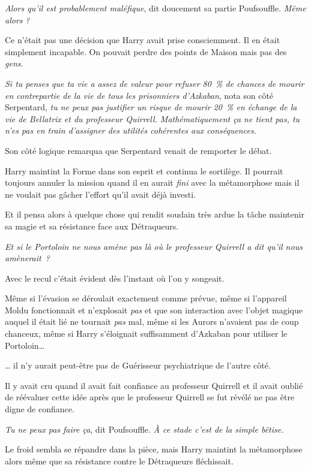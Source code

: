 \emph{Alors qu'il est probablement maléfique}, dit doucement sa partie Poufsouffle. \emph{Même alors} \emph{?}

Ce n'était pas une décision que Harry avait prise consciemment. Il en était simplement incapable. On pouvait perdre des points de Maison mais pas des \emph{gens}.

\emph{Si tu penses que ta vie a assez de valeur pour refuser 80~\% de chances de mourir en contrepartie de la vie de tous les prisonniers d'Azkaban}, nota son côté Serpentard, \emph{tu ne peux pas justifier un risque de mourir 20~\% en échange de la vie de Bellatrix et du professeur Quirrell. Mathématiquement ça ne tient pas, tu n'es pas en train d'assigner des utilités cohérentes aux conséquences.}

Son côté logique remarqua que Serpentard venait de remporter le débat.

Harry maintint la Forme dans son esprit et continua le sortilège. Il pourrait toujours annuler la mission quand il en aurait \emph{fini} avec la métamorphose mais il ne voulait pas gâcher l'effort qu'il avait déjà investi.

Et il pensa alors à quelque chose qui rendit soudain très ardue la tâche maintenir sa magie et sa résistance face aux Détraqueurs.

\emph{Et si le Portoloin ne nous amène pas là où le professeur Quirrell a dit qu'il nous amènerait~?}

Avec le recul c'était évident dès l'instant où l'on y songeait.

Même si l'évasion se déroulait exactement comme prévue, même si l'appareil Moldu fonctionnait et n'explosait \emph{pas} et que son interaction avec l'objet magique auquel il était lié ne tournait \emph{pas} mal, même si les Aurors n'avaient pas de coup chanceux, même si Harry s'éloignait suffisamment d'Azkaban pour utiliser le Portoloin…

… il n'y aurait peut-être pas de Guérisseur psychiatrique de l'autre côté.

Il y avait cru quand il avait fait confiance au professeur Quirrell et il avait oublié de réévaluer cette idée après que le professeur Quirrell se fut révélé ne pas être digne de confiance.

\emph{Tu ne peux pas faire ça}, dit Poufsouffle. \emph{À ce stade c'est de la simple bêtise.}

Le froid sembla se répandre dans la pièce, mais Harry maintint la métamorphose alors même que sa résistance contre le Détraqueurs fléchissait.

